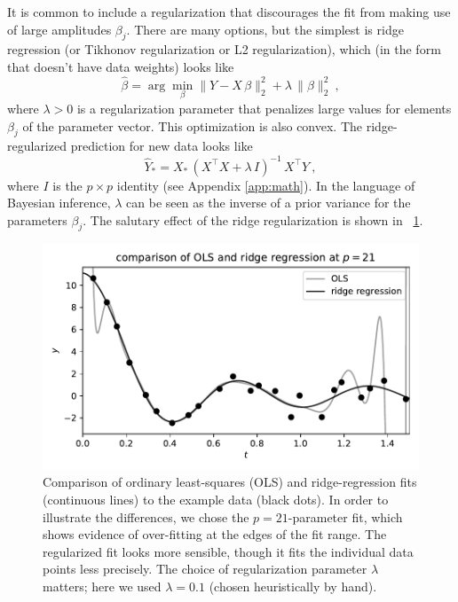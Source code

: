\documentclass[12pt,letterpaper]{article}
\newlength{\figurewidth}
\begin{document}
It is common to include a regularization that discourages the fit from making use of large amplitudes $\beta_j$.
There are many options, but the simplest is ridge regression (or Tikhonov regularization or L2 regularization), which (in the form that doesn't have data weights) looks like
\begin{equation} \label{eq:ridge}
    \hat{\beta} = \arg\min_\beta \|Y - X\,\beta\|_2^2 + \lambda\,\|\beta\|_2^2
    ~,
\end{equation}
where $\lambda>0$ is a regularization parameter that penalizes large values for elements $\beta_j$ of the parameter vector.
This optimization is also convex.
The ridge-regularized prediction for new data looks like
\begin{equation}\label{eq:ridge_sol}
    \hat{Y}_\ast = X_\ast\,(X^\top X + \lambda\,I)^{-1}\,X^\top Y
    ~,
\end{equation}
where $I$ is the $p\times p$ identity (see Appendix \ref{app:math}).
In the language of Bayesian inference, $\lambda$ can be seen as the inverse of a prior variance for the parameters $\beta_j$.
The salutary effect of the ridge regularization is shown in \figurename~\ref{fig:ridge}.
\begin{figure}[t]
    \begin{mdframed}
    \includegraphics[width=\figurewidth]{./ridge.pdf}
    \caption{Comparison of ordinary least-squares (OLS) and ridge-regression fits (continuous lines) to the example data (black dots). In order to illustrate the differences, we chose the $p=21$-parameter fit, which shows evidence of over-fitting at the edges of the fit range. The regularized fit looks more sensible, though it fits the individual data points less precisely. The choice of regularization parameter $\lambda$ matters; here we used $\lambda=0.1$ (chosen heuristically by hand).}
    \label{fig:ridge}
    \end{mdframed}
\end{figure}
\end{document}
